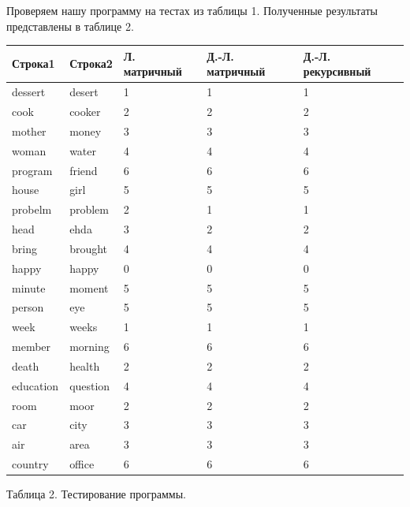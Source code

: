 \documentclass[a4paper,14pt]{article} %
\begin{document}
	\hfill
	
	Проверяем нашу программу на тестах из таблицы 1. Полученные результаты представлены в таблице 2. 
	
	\begin{center}
       		\begin{tabular}{ | l | l | l | l | l |}
			\hline
			\textbf{Строка1} & \textbf{Строка2} & \textbf{Л. матричный} & \textbf{Д.-Л. матричный}  & \textbf{Д.-Л. рекурсивный}\\ \hline
			dessert  &  desert  &  1  &  1  &  1 \\ \hline
			cook  &  cooker  &  2  &  2  &  2 \\ \hline
			mother  &  money  &  3  &  3  &  3 \\ \hline
			woman  &  water  &  4  &  4  &  4 \\ \hline
			program  &  friend  &  6  &  6  &  6 \\ \hline
			house  &  girl  &  5  &  5  &  5 \\ \hline
			probelm  &  problem  &  2  &  1  &  1 \\ \hline
			head  &  ehda  &  3  &  2  &  2 \\ \hline
			bring  &  brought  &  4  &  4  &  4 \\ \hline
			happy  &  happy  &  0  &  0  &  0 \\ \hline
			minute  &  moment  &  5  &  5  &  5 \\ \hline
			person  &  eye  &  5  &  5  &  5 \\ \hline
			week  &  weeks  &  1  &  1  &  1 \\ \hline
			member  &  morning  &  6  &  6  &  6 \\ \hline
			death  &  health  &  2  &  2  &  2 \\ \hline
			education  &  question  &  4  &  4  &  4 \\ \hline
			room  &  moor  &  2  &  2  &  2 \\ \hline
			car  &  city  &  3  &  3  &  3 \\ \hline
			air  &  area  &  3  &  3  &  3 \\ \hline
			country  &  office  &  6  &  6  &  6 \\ \hline
		\end{tabular}
		
		\hfill
		
		Таблица 2.
		Тестирование программы.  
	\end{center}
	
	\hfill
	
\end{document}
